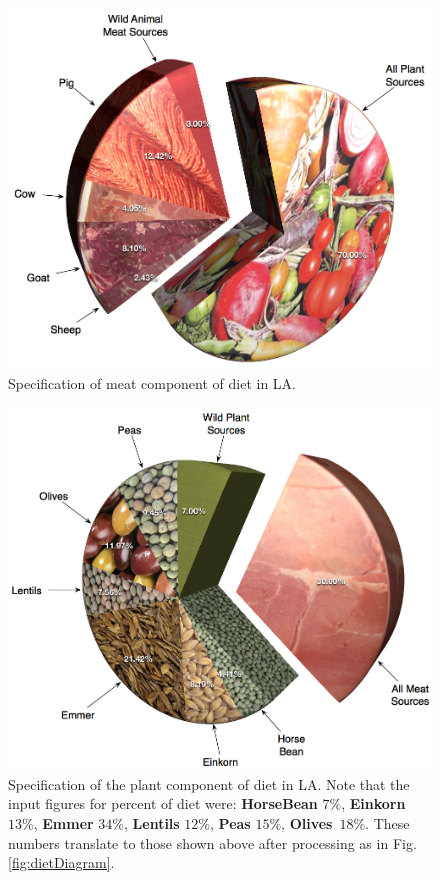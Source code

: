 \begin{figure}[ht] %
 \includegraphics[scale=.23]{./images/fancyDietMeat.jpg}
 \caption[Plant Portion of Diet]{\label{fig:dietMeatDiagram}Specification of meat component of diet in LA.}
\end{figure}

\begin{figure}[ht] %
 \includegraphics[scale=.23]{./images/dietFancyCrops.jpg}
 \caption[Plant Portion of Diet]{\label{fig:dietCropDiagram}Specification of the plant component of diet in LA.  Note that the input figures for percent of diet were: \textbf{HorseBean} $7\%$, \textbf{Einkorn} $13\%$, \textbf{Emmer} $34\%$, \textbf{Lentils} $12\%$, \textbf{Peas} $15\%$, \textbf{Olives}\ $18\%$.  These numbers translate to those shown above after processing as in Fig. \ref{fig:dietDiagram}.}
\end{figure}

